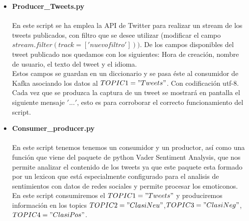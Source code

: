 \documentclass[12pt, a4paper, twoside]{article}
\begin{document}
\begin{itemize}
\item \textbf{Producer\_Tweets.py}\\\\ 
En este script se ha emplea la API de Twitter para realizar un stream de los tweets publicados, con filtro que se desee utilizar (modificar el campo $stream.filter(track=['nuevofiltro']))$. De los campos disponibles del tweet publicado nos quedamos con los siguientes: Hora de creación, nombre de usuario, el texto del tweet y el idioma.\\
 Estos campos se guardan en un diccionario y se pasa éste  al consumidor de Kafka asociando los datos al $TOPIC1 = "Tweets"$. Con codificación utf-8. Cada vez que se produzca la captura de un tweet se mostrará en pantalla el siguiente mensaje $'...'$, esto es para corroborar el correcto funcionamiento del script.

		
\item \textbf{Consumer\_producer.py}\\\\
En este script tenemos tenemos un consumidor y un productor, así como una función que viene del paquete de python Vader Sentiment Analysis, que nos permite analizar el contenido de los tweets ya que este paquete esta formado por un lexicon que está especialmente configurado para el analisis de sentimientos con datos de redes sociales y permite procesar los emoticonos.\\
En este script consumiremos el $TOPIC1 = "Tweets"$
y produciremos información en los topics $TOPIC2 = "ClasiNeu"$,$TOPIC3 = "ClasiNeg"$,$TOPIC4 = "ClasiPos"$.\\


\end{itemize}
\end{document}
